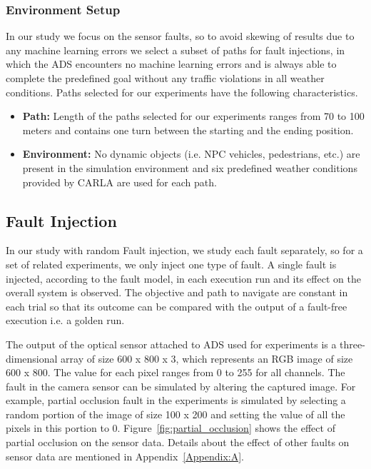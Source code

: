   \smallskip
  
 \subsubsection{Environment Setup}
 \setcounter{subsubsection}{0}
In our study we focus on the sensor faults, so to avoid skewing of results due to any machine learning errors we select a subset of paths for fault injections, in which the ADS encounters no machine learning errors and is always able to complete the predefined goal without any traffic violations in all weather conditions. Paths selected for our experiments have the following characteristics.

\begin{itemize}
	\item \textbf{Path:} Length of the paths selected for our experiments ranges from 70 to 100 meters and contains one turn between the starting and the ending position. 
	
	\smallskip
	
	\item \textbf{Environment:} No dynamic objects (i.e. NPC vehicles, pedestrians, etc.) are present in the simulation environment and six predefined weather conditions provided by CARLA are used for each path. 
\end{itemize}

 \subsection{Fault Injection} \label{fi_m}
 
 In our study with random Fault injection, we study each fault separately, so for a set of related experiments, we only inject one type of fault. A single fault is injected, according to the fault model, in each execution run and its effect on the overall system is observed. The objective and path to navigate are constant in each trial so that its outcome can be compared with the output of a fault-free execution i.e. a golden run.

The output of the optical sensor attached to ADS used for experiments is a three-dimensional array of size 600 x 800 x 3, which represents an RGB image of size 600 x 800. The value for each pixel ranges from 0 to 255 for all channels. The fault in the camera sensor can be simulated by altering the captured image. For example, partial occlusion fault in the experiments is simulated by selecting a random portion of the image of size 100 x 200 and setting the value of all the pixels in this portion to 0. Figure~\ref{fig:partial_occlusion} shows the effect of partial occlusion on the sensor data. Details about the effect of other faults on sensor data are mentioned in Appendix~\ref{Appendix:A}.
 
